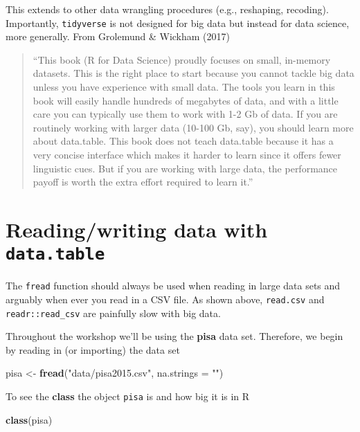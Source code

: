 \documentclass[]{book}
\newenvironment{Shaded}{\begin{snugshade}}{\end{snugshade}}
\newcommand{\DataTypeTok}[1]{\textcolor[rgb]{0.13,0.29,0.53}{#1}}
\newcommand{\KeywordTok}[1]{\textcolor[rgb]{0.13,0.29,0.53}{\textbf{#1}}}
\newcommand{\NormalTok}[1]{#1}
\newcommand{\StringTok}[1]{\textcolor[rgb]{0.31,0.60,0.02}{#1}}
\begin{document}
This extends to other data wrangling procedures (e.g., reshaping, recoding). Importantly, \texttt{tidyverse} is not designed for big data but instead for data science, more generally. From Grolemund \& Wickham (2017)

\begin{quote}
``This book (R for Data Science) proudly focuses on small, in-memory datasets. This is the right place to start because you cannot tackle big data unless you have experience with small data. The tools you learn in this book will easily handle hundreds of megabytes of data, and with a little care you can typically use them to work with 1-2 Gb of data. If you are routinely working with larger data (10-100 Gb, say), you should learn more about data.table. This book does not teach data.table because it has a very concise interface which makes it harder to learn since it offers fewer linguistic cues. But if you are working with large data, the performance payoff is worth the extra effort required to learn it.''
\end{quote}

\hypertarget{readingwriting-data-with-data.table}{%
\section{\texorpdfstring{Reading/writing data with \texttt{data.table}}{Reading/writing data with data.table}}\label{readingwriting-data-with-data.table}}

The \texttt{fread} function should always be used when reading in large data sets and arguably when ever you read in a CSV file. As shown above, \texttt{read.csv} and \texttt{readr::read\_csv} are painfully slow with big data.

Throughout the workshop we'll be using the \textbf{pisa} data set. Therefore, we begin by reading in (or importing) the data set

\begin{Shaded}
\begin{Highlighting}[]
\NormalTok{pisa <-}\StringTok{ }\KeywordTok{fread}\NormalTok{(}\StringTok{"data/pisa2015.csv"}\NormalTok{, }\DataTypeTok{na.strings =} \StringTok{""}\NormalTok{)}
\end{Highlighting}
\end{Shaded}

To see the \textbf{class} the object \texttt{pisa} is and how big it is in R

\begin{Shaded}
\begin{Highlighting}[]
\KeywordTok{class}\NormalTok{(pisa)}
\end{Highlighting}
\end{Shaded}
\end{document}
